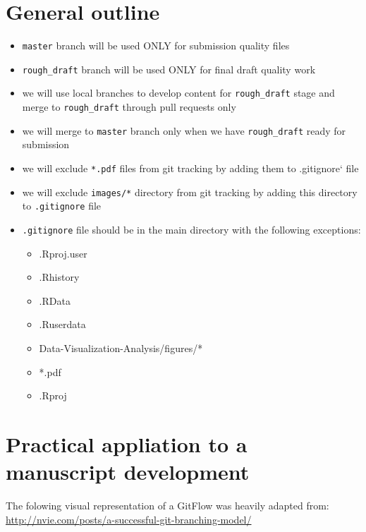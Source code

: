 \documentclass[]{book}
\providecommand{\tightlist}{%
  \setlength{\itemsep}{0pt}\setlength{\parskip}{0pt}}
\begin{document}
\section{General outline}\label{general-outline}

\begin{itemize}
\tightlist
\item
  \texttt{master} branch will be used ONLY for submission quality files
\item
  \texttt{rough\_draft} branch will be used ONLY for final draft quality
  work
\item
  we will use local branches to develop content for
  \texttt{rough\_draft} stage and merge to \texttt{rough\_draft} through
  pull requests only
\item
  we will merge to \texttt{master} branch only when we have
  \texttt{rough\_draft} ready for submission
\item
  we will exclude \texttt{*.pdf} files from git tracking by adding them
  to .gitignore` file
\item
  we will exclude \texttt{images/*} directory from git tracking by
  adding this directory to \texttt{.gitignore} file
\item
  \texttt{.gitignore} file should be in the main directory with the
  following exceptions:

  \begin{itemize}
  \tightlist
  \item
    .Rproj.user
  \item
    .Rhistory
  \item
    .RData
  \item
    .Ruserdata
  \item
    Data-Visualization-Analysis/figures/*
  \item
    *.pdf
  \item
    .Rproj
  \end{itemize}
\end{itemize}

\section{Practical appliation to a manuscript
development}\label{practical-appliation-to-a-manuscript-development}

The folowing visual representation of a GitFlow was heavily adapted
from: \url{http://nvie.com/posts/a-successful-git-branching-model/}
\end{document}
